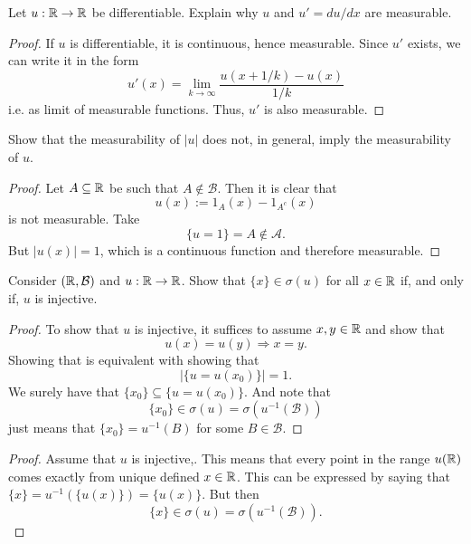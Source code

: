 \begin{thm}
Let \(u:\Bbb{R}\rightarrow \Bbb{R}\) be differentiable. Explain why \(u\) and \(u'=du/dx\) are measurable.
\end{thm}

\begin{proof}
If \(u\) is differentiable, it is continuous, hence measurable. Since \(u'\) exists, we can write it in the form
\[
u'(x)=\lim_{k\rightarrow \infty } \frac{u(x+1/k)-u(x)}{1/k}
\]
i.e. as limit of measurable functions. Thus, \(u'\) is also measurable.
\end{proof}

\begin{thm}[Problem 8.17]
Show that the measurability of \(|u|\) does not, in general, imply the measurability of \(u\).
\end{thm}

\begin{proof}
Let \(A\subseteq \Bbb{R}\) be such that \(A\not\in \mathcal{B}\). Then it is clear that
\[
u(x):=1_A(x)-1_{A^c}(x)
\]
is not measurable. Take
\[
\{u=1\}=A\not\in \mathcal{A}.
\]
But \(|u(x)|=1\), which is a continuous function and therefore measurable.

\end{proof}

\begin{thm}[Problem 8.14]
Consider \((\Bbb{R},\mathcal{B})\) and \(u:\Bbb{R}\rightarrow \Bbb{R}\). Show that \(\{x\}\in \sigma (u)\) for all \(x\in \Bbb{R}\) if, and only if, \(u\) is injective.
\end{thm}

\begin{proof}
To show that \(u\) is injective, it suffices to assume $x,y\in \Bbb{R}$ and show that
\[
u(x)=u(y)\Longrightarrow x=y.
\]
Showing that is equivalent with showing that
\[
|\{u=u(x_{0})\}|=1.
\]
We surely have that \(\{x_{0}\}\subseteq \{u=u(x_{0})\}\). And note that
\[
\{x_{0}\}\in \sigma (u)=\sigma (u^{-1}(\mathcal{B}))
\]
just means that \(\{x_{0}\}=u^{-1}(B)\) for some $B\in \mathcal{B}$.
\end{proof}

\begin{proof}
Assume that \(u\) is injective,. This means that every point in the range \(u(\Bbb{R})\) comes exactly from unique defined \(x\in \Bbb{R}\). This can be expressed by saying that \(\{x\}=u^{-1}(\{u(x)\})=\{u(x)\}.\) But then
\[
\{x\}\in \sigma (u)=\sigma (u^{-1}(\mathcal{B})).
\]
\end{proof}

